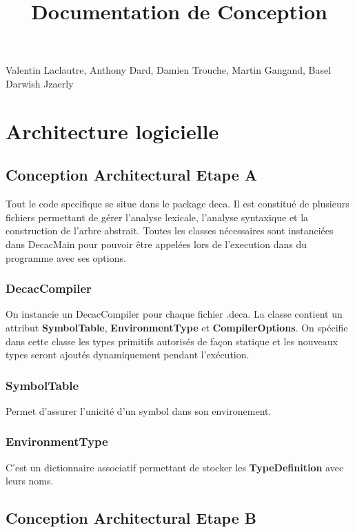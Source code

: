 \documentclass[12pt, a4paper, one side]{article}
\title{Documentation de Conception}
\author{}
\date{}
\begin{document}
    \maketitle

    \begin{center}
        Valentin Laclautre, Anthony Dard, Damien Trouche, Martin Gangand, Basel Darwish Jzaerly
    \end{center}

    \tableofcontents
    \section{Architecture logicielle}
    \subsection{Conception Architectural Etape A}
    Tout le code specifique se situe dans le package deca. Il est constitué de plusieurs fichiers
    permettant de gérer l'analyse lexicale, l'analyse syntaxique et la construction de l'arbre abstrait. Toutes les classes nécessaires sont instanciées dans DecacMain
    pour pouvoir être appelées lors de l'execution dans du programme avec ses options.
    \subsubsection{DecacCompiler}
    On instancie un DecacCompiler pour chaque fichier .deca. La classe contient un attribut \textbf{SymbolTable}, \textbf{EnvironmentType} et \textbf{CompilerOptions}. On spécifie dans cette classe les types primitifs autorisés de façon statique et les nouveaux types seront ajoutés dynamiquement pendant l'exécution.

    \subsubsection{SymbolTable}
    Permet d'assurer l'unicité d'un symbol dans son environement.

    \subsubsection{EnvironmentType}
    C'est un dictionnaire associatif permettant de stocker les \textbf{TypeDefinition} avec leurs noms.

    \subsection{Conception Architectural Etape B}
\end{document}
